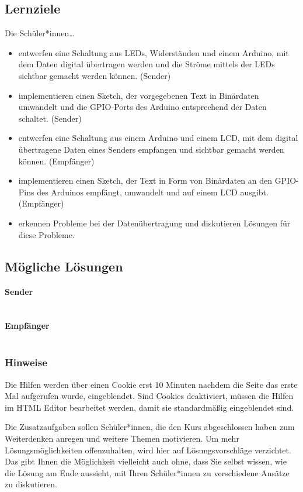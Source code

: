 \documentclass[a4paper]{article}
\begin{document}
\subsection{Lernziele}
Die Schüler*innen\dots
\begin{itemize}
    \item entwerfen eine Schaltung aus LEDs, Widerständen und einem Arduino, mit dem Daten digital übertragen werden und die Ströme mittels der LEDs sichtbar gemacht werden können. (Sender)
    \item implementieren einen Sketch, der vorgegebenen Text in Binärdaten umwandelt und die GPIO-Ports des Arduino entsprechend der Daten schaltet. (Sender)
    \item entwerfen eine Schaltung aus einem Arduino und einem LCD, mit dem digital übertragene Daten eines Senders empfangen und sichtbar gemacht werden können. (Empfänger)
    \item implementieren einen Sketch, der Text in Form von Binärdaten an den GPIO-Pins des Arduinos empfängt, umwandelt und auf einem LCD ausgibt. (Empfänger)
    \item erkennen Probleme bei der Datenübertragung und diskutieren Lösungen für diese Probleme.
\end{itemize}

\subsection{Mögliche Lösungen}
\paragraph{Sender}
\inputminted{arduino}{code/modul_4_code_sender.ino}

\paragraph{Empfänger}
\inputminted{arduino}{code/modul_4_code_empf.ino}

\subsubsection{Hinweise}
Die Hilfen werden über einen Cookie erst 10 Minuten nachdem die Seite das erste Mal aufgerufen wurde, eingeblendet. Sind Cookies deaktiviert, müssen die Hilfen im HTML Editor bearbeitet werden, damit sie standardmäßig eingeblendet sind.

Die Zusatzaufgaben sollen Schüler*innen, die den Kurs abgeschlossen haben zum Weiterdenken anregen und weitere Themen motivieren. Um mehr Lösungsmöglichkeiten offenzuhalten, wird hier auf Lösungsvorschläge verzichtet. Das gibt Ihnen die Möglichkeit vielleicht auch ohne, dass Sie selbst wissen, wie die Lösung am Ende aussieht, mit Ihren Schüler*innen zu verschiedene Ansätze zu diskutieren.
\end{document}
